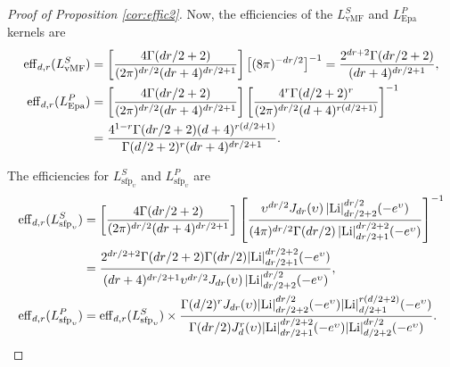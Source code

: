 \documentclass[oneside,11pt]{article}
\begin{document}
\begin{proof}[Proof of Proposition \ref{cor:effic2}]
Now, the efficiencies of the $L_\mathrm{vMF}^S$ and $L_\mathrm{Epa}^P$ kernels are
\begin{align*}
    \mathrm{eff}_{d,r}(L_\mathrm{vMF}^S)%
    &=\lrc{\frac{4\Gamma(dr/2+2)}{(2\pi)^{dr/2}(dr+4)^{dr/2+1}}} \big[(8\pi)^{-dr/2}\big]^{-1}
    = \frac{2^{dr+2} \Gamma(dr/2+2)}{(dr+4)^{dr/2+1}},\\
    \mathrm{eff}_{d,r}(L_\mathrm{Epa}^P)%
    &=\lrc{\frac{4\Gamma(dr/2+2)}{(2\pi)^{dr/2}(dr+4)^{dr/2+1}}} \lrc{\frac{4^r \Gamma(d/2+2)^r}{(2\pi)^{dr/2}(d+4)^{r(d/2+1)}}}^{-1}\\
    &= \frac{4^{1-r}\Gamma(dr/2+2)(d+4)^{r(d/2+1)}}{\Gamma(d/2+2)^r(dr+4)^{dr/2+1}}.
\end{align*}

The efficiencies for $L_{\mathrm{sfp}_\upsilon}^S$ and $L_{\mathrm{sfp}_\upsilon}^P$ are
\begin{align*}
    \mathrm{eff}_{d,r}(L_{\mathrm{sfp}_\upsilon}^S)%
    &=\lrc{\frac{4\Gamma(dr/2+2)}{(2\pi)^{dr/2}(dr+4)^{dr/2+1}}}\lrc{\frac{\upsilon^{dr/2}J_{dr}(\upsilon) \,|\mathrm{Li}|_{dr/2+2}^{dr/2}(-e^\upsilon)}{(4\pi)^{dr/2}\Gamma(dr/2) \,|\mathrm{Li}|^{dr/2+2}_{dr/2+1}(-e^\upsilon)}}^{-1}\\
    &=\frac{2^{dr/2+2}\Gamma(dr/2+2)\Gamma(dr/2)|\mathrm{Li}|^{dr/2+2}_{dr/2+1}(-e^\upsilon)}{(dr+4)^{dr/2+1} \upsilon^{dr/2}J_{dr}(\upsilon) \,|\mathrm{Li}|_{dr/2+2}^{dr/2}(-e^\upsilon)},\\
    \mathrm{eff}_{d,r}(L_{\mathrm{sfp}_\upsilon}^P)%
    &= \mathrm{eff}_{d,r}(L_{\mathrm{sfp}_\upsilon}^S) \times\frac{\Gamma(d/2)^rJ_{dr}(\upsilon)|\mathrm{Li}|_{dr/2+2}^{dr/2}(-e^\upsilon)|\mathrm{Li}|_{d/2+1}^{r(d/2+2)}(-e^\upsilon)}{\Gamma(dr/2)J_d^r(\upsilon)|\mathrm{Li}|_{dr/2+1}^{dr/2+2}(-e^\upsilon)|\mathrm{Li}|_{d/2+2}^{dr/2}(-e^\upsilon)}.
\end{align*}
\end{proof}
\end{document}

